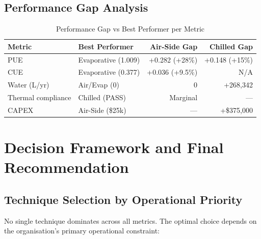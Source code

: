 ﻿\documentclass[12pt,a4paper]{report}
\begin{document}
\subsection{Performance Gap Analysis}

\begin{table}[H]
\centering
\caption{Performance Gap vs Best Performer per Metric}
\label{tab:delta_analysis}
\renewcommand{\arraystretch}{1.35}
\begin{tabular}{llrr}
\toprule
\textbf{Metric} & \textbf{Best Performer} & \textbf{Air-Side Gap} & \textbf{Chilled Gap} \\
\midrule
PUE & Evaporative (1.009) & +0.282 (+28\%) & +0.148 (+15\%) \\
CUE & Evaporative (0.377) & +0.036 (+9.5\%) & N/A \\
Water (L/yr) & Air/Evap (0) & 0 & +268{,}342 \\
Thermal compliance & Chilled (PASS) & Marginal & --- \\
CAPEX & Air-Side (\$25k) & --- & +\$375{,}000 \\
\bottomrule
\end{tabular}
\end{table}

\section{Decision Framework and Final Recommendation}
\label{sec:decision}

\subsection{Technique Selection by Operational Priority}

No single technique dominates across all metrics. The optimal choice depends on the
organisation's primary operational constraint:
\end{document}
